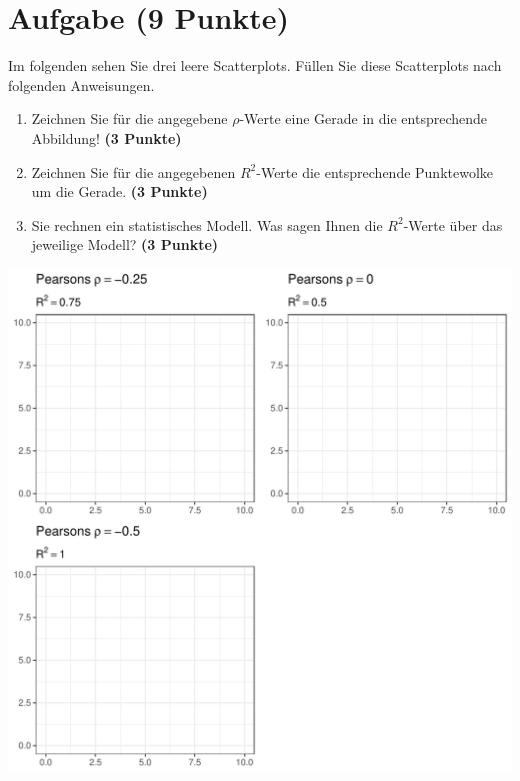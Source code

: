 \documentclass[a4paper, 10pt]{scrartcl}\usepackage[]{graphicx}\usepackage[]{color}
\makeatletter
\def\maxwidth{ %
  \ifdim\Gin@nat@width>\linewidth
    \linewidth
  \else
    \Gin@nat@width
  \fi
}
\makeatother
\begin{document}
\section{Aufgabe \hfill (9 Punkte)}

Im folgenden sehen Sie drei leere Scatterplots. F{\"u}llen Sie diese
Scatterplots nach folgenden Anweisungen.

\begin{enumerate}
\item Zeichnen Sie f{\"u}r die angegebene $\rho$-Werte eine Gerade in die
  entsprechende Abbildung! \textbf{(3 Punkte)}
\item Zeichnen Sie f{\"u}r die angegebenen $R^2$-Werte die entsprechende
  Punktewolke um die Gerade. \textbf{(3 Punkte)}
\item Sie rechnen ein statistisches Modell. Was sagen Ihnen die $R^2$-Werte
  {\"u}ber das jeweilige Modell? \textbf{(3 Punkte)}
\end{enumerate}




{\centering \includegraphics[width=\maxwidth]{img/correlation-01-1} 

}



 
\clearpage
\end{document}
